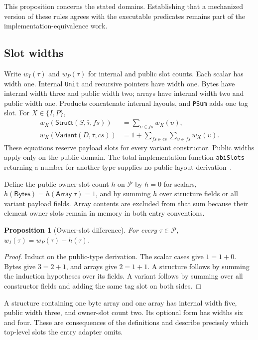 \documentclass[11pt]{article}
\newcommand{\code}[1]{\texttt{#1}}
\newcommand{\ty}[1]{\mathsf{#1}}
\newcommand{\Pp}{\mathcal{P}}
\newtheorem{proposition}[definition]{Proposition}
\begin{document}
This proposition concerns the stated domains.  Establishing that a mechanized version of these rules agrees with the executable predicates remains part of the implementation-equivalence work.

\subsection{Slot widths}

Write $w_I(\tau)$ and $w_P(\tau)$ for internal and public slot counts.  Each scalar has width one.  Internal \code{Unit} and recursive pointers have width one.  Bytes have internal width three and public width two; arrays have internal width two and public width one.  Products concatenate internal layouts, and \code{PSum} adds one tag slot.  For $X\in\{I,P\}$,
\begin{align*}
w_X(\ty{Struct}(S,\bar\tau,fs))&=\sum_{\upsilon\in fs}w_X(\upsilon),\\
w_X(\ty{Variant}(D,\bar\tau,cs))&=1+\sum_{fs\in cs}\sum_{\upsilon\in fs}w_X(\upsilon).
\end{align*}
These equations reserve payload slots for every variant constructor.  Public widths apply only on the public domain.  The total implementation function \code{abiSlots} returning a number for another type supplies no public-layout derivation~\cite{types}.

Define the public owner-slot count $h$ on $\Pp$ by $h=0$ for scalars, $h(\ty{Bytes})=h(\ty{Array}\;\tau)=1$, and by summing $h$ over structure fields or all variant payload fields.  Array contents are excluded from that sum because their element owner slots remain in memory in both entry conventions.

\begin{proposition}[Owner-slot difference]
For every $\tau\in\Pp$, $w_I(\tau)=w_P(\tau)+h(\tau)$.
\end{proposition}
\begin{proof}
Induct on the public-type derivation.  The scalar cases give $1=1+0$.  Bytes give $3=2+1$, and arrays give $2=1+1$.  A structure follows by summing the induction hypotheses over its fields.  A variant follows by summing over all constructor fields and adding the same tag slot on both sides.
\end{proof}

A structure containing one byte array and one array has internal width five, public width three, and owner-slot count two.  Its optional form has widths six and four.  These are consequences of the definitions and describe precisely which top-level slots the entry adapter omits.
\end{document}

